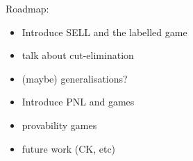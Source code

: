 
Roadmap:
\begin{itemize}
\item Introduce SELL and the labelled game
\item talk about cut-elimination
\item (maybe) generalisations?
\item Introduce PNL and games
\item provability games
\item future work (CK, etc)
\end{itemize}


